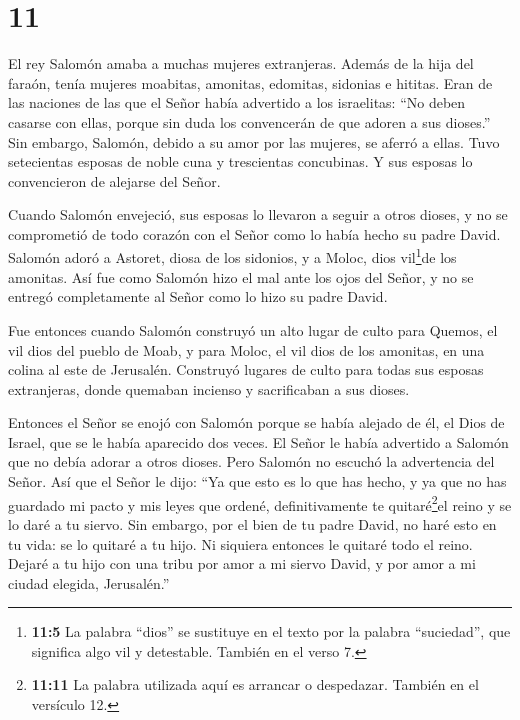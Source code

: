 \hypertarget{section-10}{%
\section{11}\label{section-10}}

 El rey Salomón amaba a muchas mujeres extranjeras. Además
de la hija del faraón, tenía mujeres moabitas, amonitas, edomitas,
sidonias e hititas.  Eran de las naciones de las que el
Señor había advertido a los israelitas: ``No deben casarse con ellas,
porque sin duda los convencerán de que adoren a sus dioses.'' Sin
embargo, Salomón, debido a su amor por las mujeres, se aferró a ellas.
 Tuvo setecientas esposas de noble cuna y trescientas
concubinas. Y sus esposas lo convencieron de alejarse del Señor.

 Cuando Salomón envejeció, sus esposas lo llevaron a seguir
a otros dioses, y no se comprometió de todo corazón con el Señor como lo
había hecho su padre David.  Salomón adoró a Astoret, diosa
de los sidonios, y a Moloc, dios vil\footnote{\textbf{11:5} La palabra
  ``dios'' se sustituye en el texto por la palabra ``suciedad'', que
  significa algo vil y detestable. También en el verso 7.}de los
amonitas.  Así fue como Salomón hizo el mal ante los ojos
del Señor, y no se entregó completamente al Señor como lo hizo su padre
David.

 Fue entonces cuando Salomón construyó un alto lugar de
culto para Quemos, el vil dios del pueblo de Moab, y para Moloc, el vil
dios de los amonitas, en una colina al este de Jerusalén. 
Construyó lugares de culto para todas sus esposas extranjeras, donde
quemaban incienso y sacrificaban a sus dioses.

 Entonces el Señor se enojó con Salomón porque se había
alejado de él, el Dios de Israel, que se le había aparecido dos veces.
 El Señor le había advertido a Salomón que no debía adorar
a otros dioses. Pero Salomón no escuchó la advertencia del Señor.
 Así que el Señor le dijo: ``Ya que esto es lo que has
hecho, y ya que no has guardado mi pacto y mis leyes que ordené,
definitivamente te quitaré\footnote{\textbf{11:11} La palabra utilizada
  aquí es arrancar o despedazar. También en el versículo 12.}el reino y
se lo daré a tu siervo.  Sin embargo, por el bien de tu
padre David, no haré esto en tu vida: se lo quitaré a tu hijo.
 Ni siquiera entonces le quitaré todo el reino. Dejaré a tu
hijo con una tribu por amor a mi siervo David, y por amor a mi ciudad
elegida, Jerusalén.''

